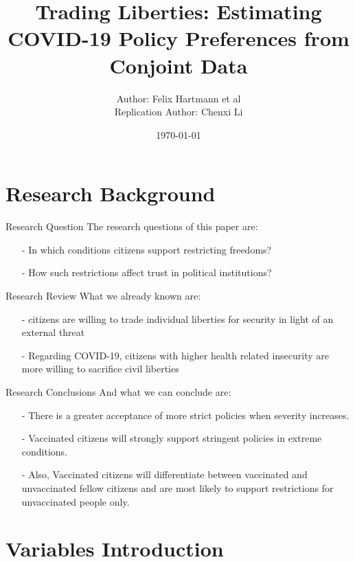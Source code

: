 \documentclass{beamer}
\title{Trading Liberties: Estimating COVID-19 Policy Preferences from Conjoint Data}
\date{\today}
\author{Author: Felix Hartmann et al \\
Replication Author: Chenxi Li}
\institute{Trinity College Dublin\\College Green, Dublin 2 \\ \par Lic8@tcd.ie}
\begin{document}
\maketitle
\section{Research Background}

\begin{frame}{Research Question}
	\noindent The research questions of this paper are:
	\begin{itemize}
		\item[-] In which conditions citizens support restricting freedoms?
		\item[-] How such restrictions affect trust in political institutions?
	\end{itemize}
\end{frame}

\begin{frame}{Research Review}
\noindent What we already known are:
\begin{itemize}
	\item[-] citizens are willing to trade individual liberties for security in light of an external threat \citep{davis2004civil}
	\item[-] Regarding COVID-19, citizens with higher health related insecurity are more willing to sacrifice civil liberties \citep{stantcheva2020civil}
\end{itemize}
\end{frame}

\begin{frame}{Research Conclusions}
\noindent And what we can conclude are:
\begin{itemize}
	\item[-] There is a greater acceptance of more strict policies when severity increases.
	\item[-] Vaccinated citizens will strongly support stringent policies in extreme conditions.
	\item[-] Also, Vaccinated citizens will differentiate between vaccinated and unvaccinated fellow citizens and are most likely to support restrictions for unvaccinated people only.  
\end{itemize}
\end{frame}

\section{Variables Introduction}
\end{document}

